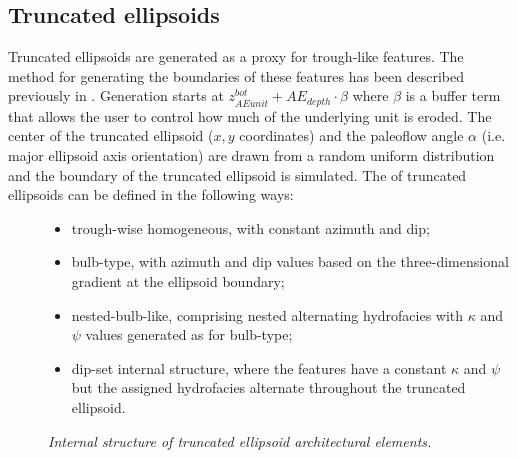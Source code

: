 \documentclass[letterpaper,10pt,english]{sphinxmanual}
\begin{document}
\subsection{Truncated ellipsoids}
\label{methods:truncated-ellipsoids}\begin{description}
\item[{Truncated ellipsoids are generated as a proxy for trough-like features. The method for generating the boundaries of these features has been described previously in \label{methods:id4}{\hyperref[references:bennett2017]{\sphinxcrossref{{[}BHC17{]}}}}. Generation starts at \(z^{bot}_{AE unit} +AE_{depth}\cdot\beta\) where \(\beta\) is a buffer term that allows the user to control how much of the underlying unit is eroded. The center of the truncated ellipsoid (\(x,y\) coordinates) and the paleoflow angle \(\alpha\) (i.e. major ellipsoid axis orientation) are drawn from a random uniform distribution and the boundary of the truncated ellipsoid is simulated. The {\hyperref[methods:internal\string-structure]{}} of truncated ellipsoids can be defined in the following ways:}] \leavevmode\begin{itemize}
\item {} 
trough-wise homogeneous, with constant azimuth and dip;

\item {} 
bulb-type, with azimuth and dip values based on the three-dimensional gradient at the ellipsoid boundary;

\item {} 
nested-bulb-like, comprising nested alternating hydrofacies with \(\kappa\) and \(\psi\) values generated as for bulb-type;

\item {} 
dip-set internal structure, where the features have a constant \(\kappa\) and \(\psi\) but the assigned hydrofacies alternate throughout the truncated ellipsoid.

\end{itemize}

\end{description}
\begin{figure}[htbp]
\centering
\capstart

\noindent{}
\caption{\emph{Internal structure of truncated ellipsoid architectural elements.}}\label{methods:structure}\label{methods:id12}\end{figure}
\end{document}
